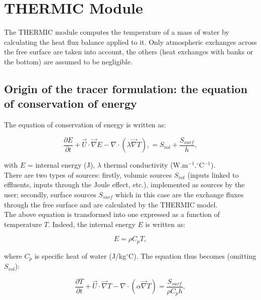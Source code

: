 \chapter{THERMIC Module}

The THERMIC module computes the temperature of a mass of water by calculating
the heat flux balance applied to it.
Only atmospheric exchanges across the free surface are taken into account,
the others (heat exchanges with banks or the bottom) are assumed to be negligible.\\

\section{Origin of the tracer formulation: the equation of conservation of energy}

The equation of conservation of energy is written as:

\begin{equation}
  \frac{\partial E}{\partial t} + \vec{U} \cdot \vec \nabla E
  - \nabla \cdot \left( \lambda \vec \nabla T \right),
  = S_{vol} + \frac{S_{surf}}{h},
\end{equation}

with $E$ = internal energy (J), $\lambda$ thermal conductivity (W.m$^{-1}$.$^{\circ}$C$^{-1}$).\\

There are two types of sources: firstly, volumic sources $S_{vol}$
(inputs linked to effluents, inputs through the Joule effect, etc.),
implemented as sources by the user; secondly, surface sources $S_{surf}$
which in this case are the exchange fluxes through the free surface
and are calculated by the THERMIC model.\\

The above equation is transformed into one expressed as a function of temperature $T$.
Indeed, the internal energy $E$ is written as:

\begin{equation}
  E = \rho C_p T,
\end{equation}

where $C_p$ is specific heat of water (J/kg$^{\circ}$C).
The equation thus becomes (omitting $S_{vol}$):

\begin{equation}
  \frac{\partial T}{\partial t} + \vec{U} \cdot \vec \nabla T
  - \nabla \cdot \left( \alpha \vec \nabla T \right)
  = \frac{S_{surf}}{\rho C_p h},
\end{equation}

